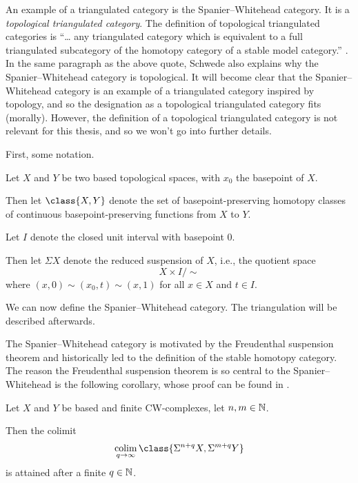 An example of a triangulated category is the Spanier--Whitehead category. It is a \emph{topological triangulated category}. The definition of topological triangulated categories is ``… any triangulated category which is equivalent to a full triangulated subcategory of the homotopy category of a stable model category.'' \cite[p.\ 6]{Schwede_2010}. In the same paragraph as the above quote, Schwede also explains why the Spanier--Whitehead category is topological. It will become clear that the Spanier--Whitehead category is an example of a triangulated category inspired by topology, and so the designation as a topological triangulated category fits (morally). However, the definition of a topological triangulated category is not relevant for this thesis, and so we won't go into further details. 

First, some notation.
\begin{notation}
    Let \( X \) and \( Y \) be two based topological spaces, with \( x_0 \) the basepoint of \( X \).

    Then let \( \class{ X, Y } \) denote the set of basepoint-preserving homotopy classes of continuous basepoint-preserving functions from \( X \) to \( Y \).

    Let \( I \) denote the closed unit interval with basepoint \( 0 \).

    Then let \( \Sigma X \) denote the reduced suspension of \( X \), i.e., the quotient space
    \[
        X \times I / \sim
    \]
    where \( (x, 0) \sim (x_0, t) \sim (x, 1) \) for all \( x \in X \)  and \( t \in I \).
\end{notation}

We can now define the Spanier--Whitehead category. The triangulation will be described afterwards.

The Spanier--Whitehead category is motivated by the Freudenthal suspension theorem and historically led to the definition of the stable homotopy category. The reason the Freudenthal suspension theorem is so central to the Spanier--Whitehead is the following corollary, whose proof can be found in \cite[Remark 5.2]{Daria_Bachelor}.

\begin{corollary}
    \label{cor:sw_freudenthal_suspension}
    Let \( X \) and \( Y \) be based and finite CW-complexes, let \( n, m \in {\mathbb{N}} \).
    
    Then the colimit
    \[
        \colim_{q \to \infty} \class{ \Sigma^{n + q} X, \Sigma^{m + q} Y }
    \]
    is attained after a finite \( q \in {\mathbb{N}} \).
\end{corollary}

